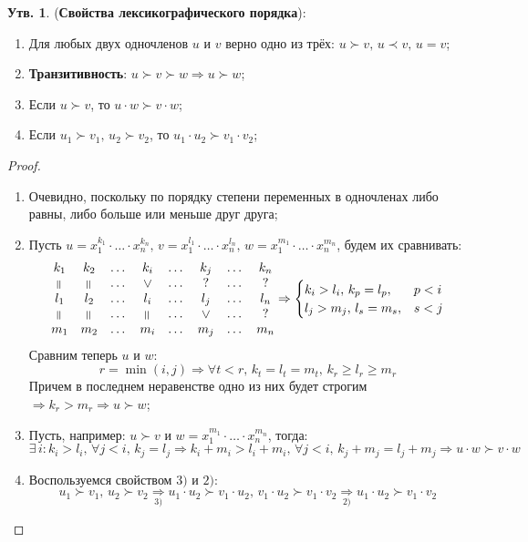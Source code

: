 \documentclass[12pt]{article}
\theoremstyle{definition}
\newtheorem{prop}{Утв.}
\begin{document}
\begin{prop}(\textbf{Свойства лексикографического порядка}):
	\begin{enumerate}[label=\arabic*)]
		\item Для любых двух одночленов $u$ и $v$ верно одно из трёх: $u \succ v,\, u \prec v, \, u =v$;
		\item \textbf{Транзитивность}: $u \succ v \succ w \Rightarrow u \succ w$;
		\item Если $u \succ v$, то $u{\cdot}w \succ v{\cdot}w$;
		\item Если $u_1 \succ v_1, \, u_2 \succ v_2$, то $u_1{\cdot}u_2 \succ v_1{\cdot}v_2$;
	\end{enumerate}
\end{prop}
\begin{proof}\hfill
	\begin{enumerate}[label=\arabic*)]
		\item Очевидно, поскольку по порядку степени переменных в одночленах либо равны, либо больше или меньше друг друга;
		
		\item Пусть $u = x_1^{k_1}{\cdot}\dotsc{\cdot}x_n^{k_n}, \, v = x_1^{l_1}{\cdot}\dotsc{\cdot}x_n^{l_n}, \, w = x_1^{m_1}{\cdot}\dotsc{\cdot}x_n^{m_n}$, будем их сравнивать:
		$$
			\begin{matrix}
				k_1 & k_2 & \dotsc & k_i & \dotsc & k_j & \dotsc & k_n \\
				\rotatebox[origin = c]{90}{=} & \rotatebox[origin = c]{90}{=} & \dotsc & \rotatebox[origin = c]{-90}{>} & \dotsc & ? & \dotsc & ? \\
				l_1 & l_2 & \dotsc & l_i & \dotsc & l_j & \dotsc & l_n \\
				\rotatebox[origin = c]{90}{=} & \rotatebox[origin = c]{90}{=} & \dotsc & \rotatebox[origin = c]{90}{=} & \dotsc & \rotatebox[origin = c]{-90}{>} & \dotsc & ? \\
				m_1 & m_2 & \dotsc & m_i & \dotsc & m_j & \dotsc & m_n
			\end{matrix} \Rightarrow
			\begin{cases}
				k_i > l_i, \, k_p = l_p, & p < i\\
				l_j > m_j, \, l_s = m_s, & s < j	
			\end{cases}
		$$
		Сравним теперь $u$ и $w$:
		$$
			r = \min(i,j) \Rightarrow \forall t < r, \, k_t = l_t = m_t,  \, k_r \geq l_r \geq m_r
		$$
		Причем в последнем неравенстве одно из них будет строгим $\Rightarrow k_r > m_r \Rightarrow u \succ w$;
		\item Пусть, например: $u \succ v$ и $w = x_1^{m_1}{\cdot}\dotsc{\cdot}x_n^{m_n}$, тогда:
		$$
			\exists \, i \colon k_i > l_i, \, \forall j < i, \, k_j = l_j \Rightarrow k_i + m_i > l_i + m_i, \, \forall j < i, \, k_j + m_j = l_j + m_j \Rightarrow u{\cdot}w \succ v{\cdot}w	
		$$
		\item Воспользуемся свойством $3)$ и $2)$:
		$$
			u_1 \succ v_1, \, u_2 \succ v_2 \underset{3)}{\Rightarrow} u_1{\cdot}u_2 \succ v_1{\cdot}u_2,\, v_1{\cdot}u_2 \succ v_1{\cdot}v_2 \underset{2)}{\Rightarrow} u_1{\cdot}u_2 \succ v_1{\cdot}v_2
		$$
	\end{enumerate}
\end{proof}
\end{document}
